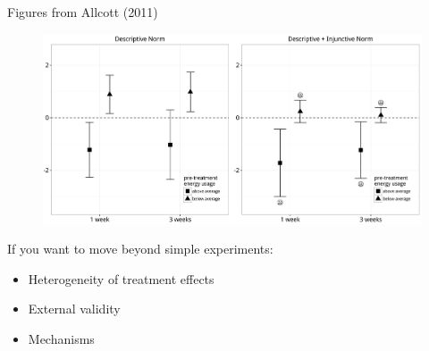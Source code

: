\documentclass[aspectratio=169]{beamer}
\def\vf{\vfill}
\begin{document}
\begin{frame}

\begin{figure}
  \centering
\end{figure}

\vf
\tiny{Figures from Allcott (2011)}

\end{frame}
\begin{frame}

\begin{figure}
  \centering
  \includegraphics[width = \textwidth]{figures/schultz_constructive_2007_23panel}
\end{figure}

\end{frame}
\begin{frame}

If you want to move beyond simple experiments:
\begin{itemize}
\item Heterogeneity of treatment effects
\item External validity
\item Mechanisms
\end{itemize}

\end{frame}
\end{document}

